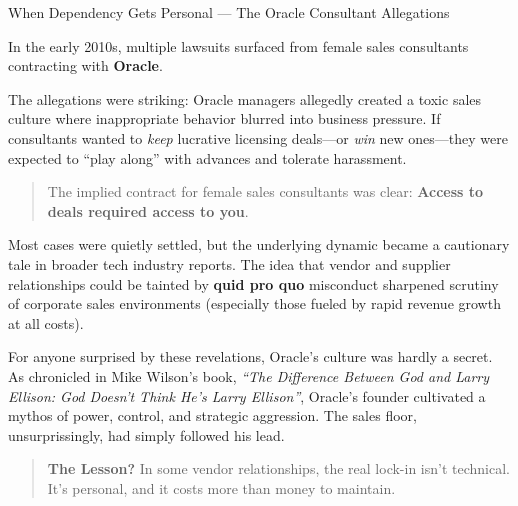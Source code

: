 \medskip

\begin{HistoricalSidebar}{When Dependency Gets Personal --- The Oracle Consultant Allegations}
  
  In the early 2010s, multiple lawsuits surfaced from female sales consultants contracting with \textbf{Oracle}.  
  
  \medskip
  
  The allegations were striking: Oracle managers allegedly created a toxic sales culture where inappropriate behavior blurred into business pressure.  If consultants wanted to \textit{keep} lucrative licensing deals—or \textit{win} new ones—they were expected to ``play along'' with advances and tolerate harassment.
  
  \medskip
  
  \begin{quote}
  The implied contract for female sales consultants was clear: \textbf{Access to deals required access to you}.
  \end{quote}
  
  \medskip
  
  Most cases were quietly settled, but the underlying dynamic became a cautionary tale in broader tech industry reports.  The idea that vendor and supplier relationships could be tainted by \textbf{quid pro quo} misconduct sharpened scrutiny of corporate sales environments (especially those fueled by rapid revenue growth at all costs).
  
  \medskip
  
  For anyone surprised by these revelations, Oracle's culture was hardly a secret.  As chronicled in Mike Wilson's book, \textit{``The Difference Between God and Larry Ellison: God Doesn't Think He's Larry Ellison''}, Oracle’s founder cultivated a mythos of power, control, and strategic aggression.  The sales floor, unsurprissingly, had simply followed his lead.
  
  \medskip
  
  \begin{quote}
  \textbf{The Lesson?} In some vendor relationships, the real lock-in isn't technical. It's personal, and it costs more than money to maintain.
  \end{quote}
  
\end{HistoricalSidebar}

\medskip


